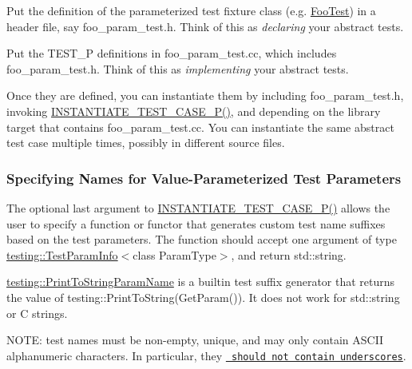 \begin{DoxyEnumerate}
\item Put the definition of the parameterized test fixture class (e.\+g. {\ttfamily \mbox{\hyperlink{classFooTest}{Foo\+Test}}}) in a header file, say {\ttfamily foo\+\_\+param\+\_\+test.\+h}. Think of this as {\itshape declaring} your abstract tests.
\end{DoxyEnumerate}
\begin{DoxyEnumerate}
\item Put the {\ttfamily T\+E\+S\+T\+\_\+P} definitions in {\ttfamily foo\+\_\+param\+\_\+test.\+cc}, which includes {\ttfamily foo\+\_\+param\+\_\+test.\+h}. Think of this as {\itshape implementing} your abstract tests.
\end{DoxyEnumerate}

Once they are defined, you can instantiate them by including {\ttfamily foo\+\_\+param\+\_\+test.\+h}, invoking {\ttfamily \mbox{\hyperlink{gtest-param-test_8h_a9e411d086a08ba0cd14b73fb2f8d028f}{I\+N\+S\+T\+A\+N\+T\+I\+A\+T\+E\+\_\+\+T\+E\+S\+T\+\_\+\+C\+A\+S\+E\+\_\+\+P()}}}, and depending on the library target that contains {\ttfamily foo\+\_\+param\+\_\+test.\+cc}. You can instantiate the same abstract test case multiple times, possibly in different source files.

\subsubsection*{Specifying Names for Value-\/\+Parameterized Test Parameters}

The optional last argument to {\ttfamily \mbox{\hyperlink{gtest-param-test_8h_a9e411d086a08ba0cd14b73fb2f8d028f}{I\+N\+S\+T\+A\+N\+T\+I\+A\+T\+E\+\_\+\+T\+E\+S\+T\+\_\+\+C\+A\+S\+E\+\_\+\+P()}}} allows the user to specify a function or functor that generates custom test name suffixes based on the test parameters. The function should accept one argument of type {\ttfamily \mbox{\hyperlink{structtesting_1_1TestParamInfo}{testing\+::\+Test\+Param\+Info}}$<$class Param\+Type$>$}, and return {\ttfamily std\+::string}.

{\ttfamily \mbox{\hyperlink{structtesting_1_1PrintToStringParamName}{testing\+::\+Print\+To\+String\+Param\+Name}}} is a builtin test suffix generator that returns the value of {\ttfamily testing\+::\+Print\+To\+String(\+Get\+Param())}. It does not work for {\ttfamily std\+::string} or C strings.

N\+O\+TE\+: test names must be non-\/empty, unique, and may only contain A\+S\+C\+II alphanumeric characters. In particular, they \href{https://g3doc.corp.google.com/third_party/googletest/googletest/g3doc/faq.md\#no-underscores}{\texttt{ should not contain underscores}}.


